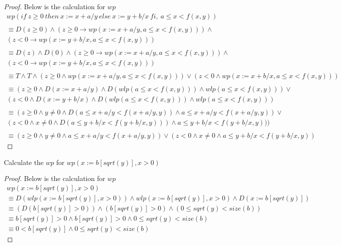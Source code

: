 \documentclass[12pt]{article}
\newenvironment{exercise}[2][Exercise]{\begin{trivlist}
\item[\hskip \labelsep {\bfseries #1}\hskip \labelsep {\bfseries #2.}]}{\end{trivlist}}
\begin{document}
\begin{proof}
Below is the calculation for $wp$
\begin{gather*}
    wp(if\: z \geq 0\: then\: x:= x + a/y\: else\: x:= y + b/x\: fi,\: a \leq x < f(x,y)) \\ \\
    \equiv D(z \geq 0) \land (z \geq 0 \rightarrow wp(x := x + a/y, a \leq x < f(x,y))) \land \\
    (z < 0 \rightarrow wp(x := y + b/x, a \leq x < f(x,y))) \\ \\
    \equiv D(z) \land D(0) \land (z \geq 0 \rightarrow wp(x := x + a/y, a \leq x < f(x,y))) \land \\
    (z < 0 \rightarrow wp(x := y + b/x, a \leq x < f(x,y))) \\ \\
    \equiv T \land T \land (z \geq 0 \land wp(x := x + a/y, a \leq x < f(x,y))) \lor (z < 0 \land wp(x := x + b/x, a \leq x < f(x,y))) \\ \\ 
    \equiv (z \geq 0 \land D(x:=x+a/y) \land D(wlp(a \leq x < f(x,y))) \land wlp(a \leq x < f(x,y))) \lor \\ (z < 0 \land D(x:= y + b/x) \land D(wlp(a \leq x < f(x,y))) \land wlp(a \leq x < f(x,y))) \\ \\ 
    \equiv (z \geq 0 \land y \neq 0 \land D(a \leq x+a/y < f(x+a/y,y)) \land a \leq x + a/y < f(x+a/y,y)) \lor \\ (z < 0 \land x \neq 0 \land D(a \leq y+b/x < f(y+b/x,y))) \land a \leq y+b/x < f(y+b/x,y))) \\ \\ 
    \equiv (z \geq 0 \land y \neq 0 \land a \leq x+a/y < f(x+a/y,y)) \lor (z < 0 \land x \neq 0 \land a \leq y+b/x < f(y+b/x,y))
\end{gather*}

\end{proof}

\begin{exercise}{6}
Calculate the $wp$ for $wp(x := b[sqrt(y)], x > 0)$
\end{exercise}

\begin{proof}
Below is the calculation for $wp$
\begin{gather*}
    wp(x := b[sqrt(y)], x > 0) \\
    \equiv D(wlp(x:=b[sqrt(y)], x >0)) \land wlp(x:=b[sqrt(y)], x  > 0) \land D(x:= b[sqrt(y)]) \\ 
    \equiv (D(b[sqrt(y)] > 0)) \land (b[sqrt(y)] > 0) \land (0 \leq sqrt(y) < size(b)) \\ 
    \equiv b[sqrt(y)] > 0 \land b[sqrt(y)] > 0 \land 0 \leq sqrt(y) < size(b) \\ 
    \equiv 0 < b[sqrt(y)] \land 0 \leq sqrt(y) < size(b)
\end{gather*}

\end{proof}
\end{document}
